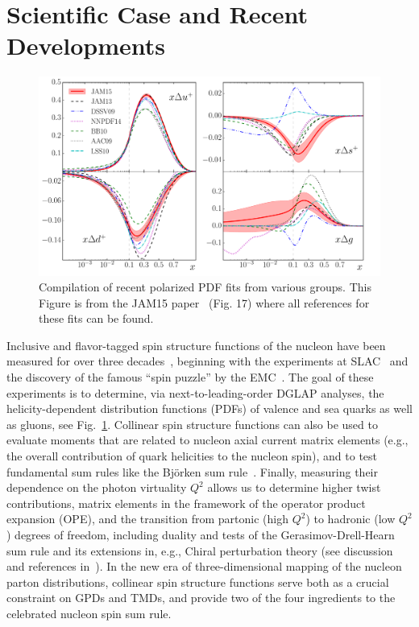 \section{Scientific Case and Recent Developments}

\begin{figure}[htb!]
\begin{center}
\includegraphics[width=6in]{dis/LT_all_groups.pdf}
\end{center}
\caption{\baselineskip 13pt \small
Compilation of recent  polarized PDF fits from various groups. This Figure is from the  JAM15 paper~\cite{JAM15}
(Fig. 17) where all references for these fits can be found.}
\label{NLOfits}
\end{figure}

Inclusive and flavor-tagged spin structure functions of the nucleon have been measured for  over three decades~\cite{Kuhn:2008sy}, beginning with the
experiments at SLAC~\cite{Alguard:1976bm} and the discovery of the famous ``spin puzzle'' by the 
EMC~\cite{EMCfinal}. The goal of these experiments is to determine, via next-to-leading-order DGLAP analyses, 
 the helicity-dependent distribution functions (PDFs)
 of valence and sea quarks as well as gluons, see Fig.~\ref{NLOfits}. Collinear spin structure functions can also be used to evaluate 
 moments that are related to nucleon axial current matrix elements (e.g., the overall contribution of quark helicities to the
 nucleon spin), and to test fundamental sum rules like the Bj\"orken sum rule~\cite{Bjorken:1968dy}. 
 Finally, measuring their dependence on the
 photon virtuality $Q^2$ allows us to determine higher twist contributions, matrix elements in the framework of the operator
 product expansion (OPE), and the transition from partonic (high $Q^2$) to hadronic (low $Q^2$) degrees of freedom,
 including duality and 
 tests of the Gerasimov-Drell-Hearn sum rule and its extensions in, e.g., Chiral perturbation theory (see
 discussion and references in~\cite{Kuhn:2008sy}).
 In the new era of three-dimensional mapping of the nucleon parton distributions, collinear spin structure functions
 serve both as a crucial constraint on GPDs and TMDs, and provide two of the four ingredients to the celebrated
 nucleon spin sum rule.
 
